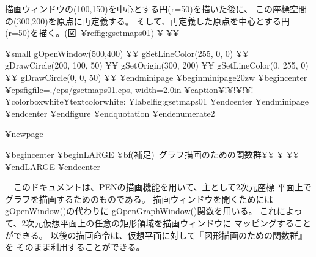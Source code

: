 描画ウィンドウの(100,150)を中心とする円(r=50)を描いた後に、
この座標空間の(300,200)を原点に再定義する。
そして、再定義した原点を中心とする円(r=50)を描く。(図~¥ref{fig:gsetmaps01})
¥ ¥¥

{¥small{
          gOpenWindow(500,400) ¥¥
          gSetLineColor(255, 0, 0)  ¥¥
          gDrawCircle(200, 100, 50)  ¥¥
          gSetOrigin(300, 200) ¥¥
          gSetLineColor(0, 255, 0)  ¥¥
          gDrawCircle(0, 0, 50)  ¥¥
}}
¥end{minipage}
¥begin{minipage}{20zw}
¥begin{center}
¥epsfig{file=./eps/gsetmaps01.eps, width=2.0in}
¥caption{$¥!¥!¥!¥!$¥colorbox{white}{{¥textcolor{white}{:}}}}
¥label{fig:gsetmaps01}
¥end{center}
¥end{minipage}
¥end{center}
¥end{figure}
   ¥end{quotation}
¥end{enumerate2}

% 

¥newpage

¥begin{center}
¥begin{LARGE}
{¥bf{(補足)~グラフ描画のための関数群¥¥
¥ ¥¥}}
¥end{LARGE}
¥end{center}

　このドキュメントは、PENの描画機能を用いて、主として2次元座標
平面上でグラフを描画するためのものである。
描画ウィンドウを開くためにはgOpenWindow()の代わりに
gOpenGraphWindow()関数を用いる。
これによって、2次元仮想平面上の任意の矩形領域を描画ウィンドウに
マッピングすることができる。
以後の描画命令は、仮想平面に対して『図形描画のための関数群』を
そのまま利用することができる。


